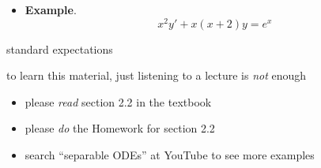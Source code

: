 \documentclass{beamer}
\begin{document}
\begin{comment}
\begin{frame}
\begin{itemize}
    \item \textbf{Example}.  suppose we have a system with solution $s(t)$ which responds to an input $f(t)$:
        $$\dot s = -k s + f(t), \qquad s(0)=0$$
    
    suppose the input is pulses:
\end{itemize}

\vspace{5mm}
FIXME %
\end{frame}


\begin{frame}
\begin{itemize}
    \item \textbf{Example}.  
        $$\dot s = -k s + f(t), \qquad s(0)=0$$
    
    the solution is
        $$s(t) = e^{-kt} \int_0^t e^{k\tau} f(\tau)\,d\tau$$
\end{itemize}
\end{frame}
\end{comment}


\begin{frame}
\begin{itemize}
    \item \textbf{Example}.
        $$x^2 y' + x(x+2) y = e^x$$
\end{itemize}
\end{frame}



\begin{frame}{standard expectations}

to learn this material, just listening to a lecture is \emph{not} enough
\begin{itemize}
\item please \emph{read} section 2.2 in the textbook
\item please \emph{do} the Homework for section 2.2
\item search ``separable ODEs'' at YouTube to see more examples
\end{itemize}
\end{frame}
\end{document}
